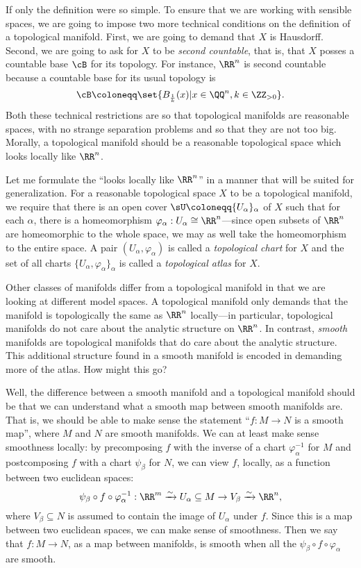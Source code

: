 \documentclass{axolotl}
\begin{document}
If only the definition were so simple. To ensure that we are working with
sensible spaces, we are going to impose two more technical conditions on the
definition of a topological manifold. First, we are going to demand that \(X\)
is Hausdorff. Second, we are going to ask for \(X\) to be \textit{second
  countable}, that is, that \(X\) posses a countable base \(\cB\) for its
topology. For instance, \(\RR^n\) is second countable because a countable base
for its usual topology is
\[ \cB \coloneqq \set{B_{\frac{1}{k}}(x) | x \in \QQ^n, k \in \ZZ_{> 0}}. \]
Both these technical restrictions are so that topological manifolds are
reasonable spaces, with no strange separation problems and so that they are not
too big. Morally, a topological manifold should be a reasonable topological
space which looks locally like \(\RR^n\).

Let me formulate the ``looks locally like \(\RR^n\)'' in a manner that will
be suited for generalization. For a reasonable topological space \(X\) to be a
topological manifold, we require that there is an open cover \(\sU \coloneqq
  \{U_\alpha\}_\alpha\) of \(X\) such that for each \(\alpha\), there is a
homeomorphism \(\varphi_\alpha: U_\alpha \cong \RR^n\)---since open subsets of
\(\RR^n\) are homeomorphic to the whole space, we may as well take the
homeomorphism to the entire space. A pair \((U_\alpha,\varphi_\alpha)\) is
called a \textit{topological chart} for \(X\) and the set of all charts
\(\{U_\alpha,\varphi_\alpha\}_\alpha\) is called a \textit{topological atlas}
for \(X\).

Other classes of manifolds differ from a topological manifold in that we
are looking at different model spaces. A topological manifold only demands that
the manifold is topologically the same as \(\RR^n\) locally---in particular,
topological manifolds do not care about the analytic structure on \(\RR^n\). In
contrast, \textit{smooth} manifolds are topological manifolds that do care
about the analytic structure. This additional structure found in a smooth
manifold is encoded in demanding more of the atlas. How might this go?

Well, the difference between a smooth manifold and a topological manifold should
be that we can understand what a smooth map between smooth manifolds are. That
is, we should be able to make sense the statement ``\(f: M \to N\) is a smooth
map'', where \(M\) and \(N\) are smooth manifolds. We can at least make sense
smoothness locally: by precomposing \(f\) with the inverse of a chart
\(\varphi_\alpha^{-1}\) for \(M\) and postcomposing \(f\) with a chart
\(\psi_\beta\) for \(N\), we can view \(f\), locally, as a function between two
euclidean spaces:
\[ \psi_\beta\circ f \circ \varphi^{-1}_\alpha: \RR^m \xrightarrow{\sim} U_\alpha \subseteq M \rightarrow V_\beta \xrightarrow{\sim} \RR^n, \]
where \(V_\beta \subseteq N\) is assumed to contain the image of \(U_\alpha\)
under \(f\). Since this is a map between two euclidean spaces, we can make
sense of smoothness. Then we say that \(f: M \to N\), as a map between
manifolds, is smooth when all the \(\psi_\beta \circ f \circ \varphi_\alpha\)
are smooth.
\end{document}
